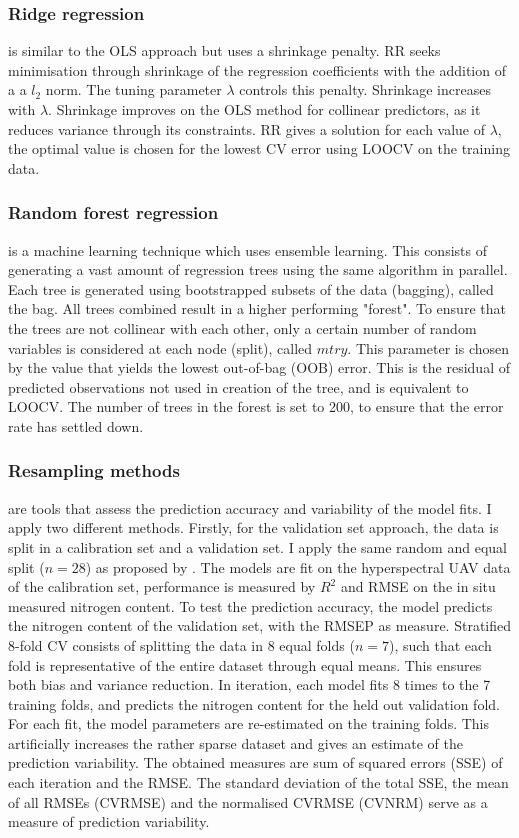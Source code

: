 \documentclass{isprs}
\begin{document}
\subsubsection{Ridge regression} is similar to the OLS approach but uses a shrinkage penalty. RR seeks minimisation through shrinkage of the regression coefficients with the addition of a a $l_2$ norm. The tuning parameter $\lambda$ controls this penalty. Shrinkage increases with $\lambda$. Shrinkage improves on the OLS method for collinear predictors, as it reduces variance through its constraints. RR gives a solution for each value of $\lambda$, the optimal value is chosen for the lowest CV error using LOOCV on the training data. 

\subsubsection{Random forest regression} is a machine learning technique which uses ensemble learning. This consists of generating a vast amount of regression trees using the same algorithm in parallel. Each tree is generated using bootstrapped subsets of the data (bagging), called the bag. All trees combined result in a higher performing "forest". To ensure that the trees are not collinear with each other, only a certain number of random variables is considered at each node (split), called $mtry$. This parameter is chosen by the value that yields the lowest out-of-bag (OOB) error. This is the residual of predicted observations not used in creation of the tree, and is equivalent to LOOCV. The number of trees in the forest is set to 200, to ensure that the error rate has settled down. 


\subsubsection{Resampling methods} are tools that assess the prediction accuracy and variability of the model fits. I apply two different methods. Firstly, for the validation set approach, the data is split in a calibration set and a validation set. I apply the same random and equal split ($n = 28$) as proposed by \cite{VanDerMeij2017}. The models are fit on the hyperspectral UAV data of the calibration set, performance is measured by $R^2$ and RMSE on the in situ measured nitrogen content. To test the prediction accuracy, the model predicts the nitrogen content of the validation set, with the RMSEP as measure. Stratified 8-fold CV consists of splitting the data in 8 equal folds ($n = 7$), such that each fold is representative of the entire dataset through equal means. This ensures both bias and variance reduction. In iteration, each model fits 8 times to the 7 training folds, and predicts the nitrogen content for the held out validation fold. For each fit, the model parameters are re-estimated on the training folds. This artificially increases the rather sparse dataset and gives an estimate of the prediction variability. The obtained measures are sum of squared errors (SSE) of each iteration and the RMSE. The standard deviation of the total SSE, the mean of all RMSEs (CVRMSE) and the normalised CVRMSE (CVNRM) serve as a measure of prediction variability.
\end{document}
